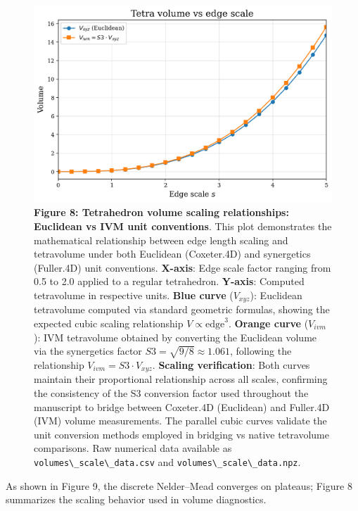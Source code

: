 \documentclass[
  10pt,
]{article}
\newcommand{\passthrough}[1]{#1}
\begin{document}
\begin{figure}
\centering
\includegraphics{../output/figures/volumes_scale_plot.png}
\caption{\textbf{Figure 8: Tetrahedron volume scaling relationships:
Euclidean vs IVM unit conventions}. This plot demonstrates the
mathematical relationship between edge length scaling and tetravolume
under both Euclidean (Coxeter.4D) and synergetics (Fuller.4D) unit
conventions. \textbf{X-axis}: Edge scale factor ranging from 0.5 to 2.0
applied to a regular tetrahedron. \textbf{Y-axis}: Computed tetravolume
in respective units. \textbf{Blue curve} (\(V_{xyz}\)): Euclidean
tetravolume computed via standard geometric formulas, showing the
expected cubic scaling relationship \(V \propto \text{edge}^3\).
\textbf{Orange curve} (\(V_{ivm}\)): IVM tetravolume obtained by
converting the Euclidean volume via the synergetics factor
\(S3 = \sqrt{9/8} \approx 1.061\), following the relationship
\(V_{ivm} = S3 \cdot V_{xyz}\). \textbf{Scaling verification}: Both
curves maintain their proportional relationship across all scales,
confirming the consistency of the S3 conversion factor used throughout
the manuscript to bridge between Coxeter.4D (Euclidean) and Fuller.4D
(IVM) volume measurements. The parallel cubic curves validate the unit
conversion methods employed in bridging vs native tetravolume
comparisons. Raw numerical data available as
\passthrough{\lstinline!volumes\_scale\_data.csv!} and
\passthrough{\lstinline!volumes\_scale\_data.npz!}.}
\end{figure}

As shown in Figure 9, the discrete Nelder--Mead converges on plateaus;
Figure 8 summarizes the scaling behavior used in volume diagnostics.
\end{document}
